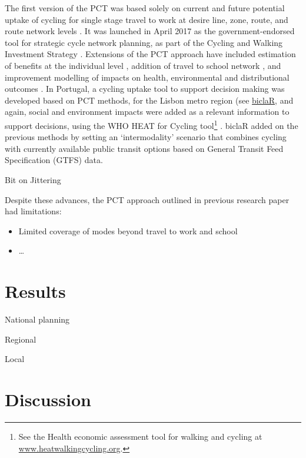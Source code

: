 \documentclass[
  super,
  preprint,
  3p]{elsarticle}
\begin{document}
The first version of the PCT was based solely on current and future
potential uptake of cycling for single stage travel to work at desire
line, zone, route, and route network levels \citep{lovelace2016}. It was
launched in April 2017 as the government-endorsed tool for strategic
cycle network planning, as part of the Cycling and Walking Investment
Strategy \citep{cycling2017}. Extensions of the PCT approach have
included estimation of benefits at the individual level
\citep{woodcock2018}, addition of travel to school network
\citep{goodman2019}, and improvement modelling of impacts on health,
environmental and distributional outcomes \citep{woodcock2021}. In
Portugal, a cycling uptake tool to support decision making was developed
based on PCT methods, for the Lisbon metro region (see
\href{https://biclar.tmlmobilidade.pt}{biclaR}, and again, social and
environment impacts were added as a relevant information to support
decisions, using the WHO HEAT for Cycling tool\footnote{See the Health
  economic assessment tool for walking and cycling at
  \href{https://www.heatwalkingcycling.org/\#homepage}{www.heatwalkingcycling.org}.}
\citep{felix2023}. biclaR added on the previous methods by setting an
`intermodality' scenario that combines cycling with currently available
public transit options based on General Transit Feed Specification
(GTFS) data.

Bit on Jittering \citep{lovelace2022}

Despite these advances, the PCT approach outlined in previous research
paper had limitations:

\begin{itemize}
\item
  Limited coverage of modes beyond travel to work and school
\item
  \ldots{}
\end{itemize}

\hypertarget{results}{%
\section{Results}\label{results}}

National planning

Regional

Local

\hypertarget{discussion}{%
\section{Discussion}\label{discussion}}
\end{document}
